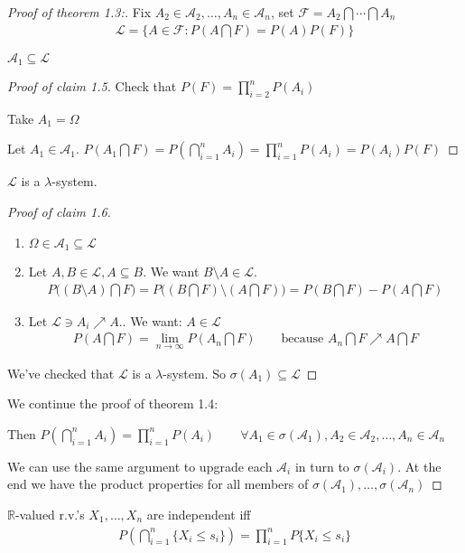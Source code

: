 \documentclass[11pt]{article}
\begin{document}
\vspace*{7mm}
\begin{proof}[Proof of theorem 1.3:]
    Fix $A_2 \in \mathcal{A}_{2}, \ldots ,A_n \in \mathcal{A}_{n}$, set 
    $\mathcal{F} = A_2 \bigcap \cdots \bigcap A_n$
    \begin{align*}
        \mathcal{L} = \{ A \in \mathcal{F}: P(A \bigcap F) = P(A)P(F) \}
    \end{align*}
    \begin{claim}
        $\mathcal{A}_1 \subseteq \mathcal{L}$
        \begin{proof}[Proof of claim 1.5]
            Check that $P(F) = \prod_{i=2}^{n}P(A_{i}) $

            Take $A_1 = \Omega$

            Let $A_1 \in \mathcal{A}_{1}$. $P(A_{1} \bigcap F) = P(\bigcap_{i=1}^{n}A_{i})
            = \prod_{i=1}^{n}P(A_{i}) = P(A_{i})P(F) $
        \end{proof}
    \end{claim}
    \begin{claim}
        $\mathcal{L}$ is a $\lambda$-system.
        \begin{proof}[Proof of claim 1.6]
            \begin{enumerate}
                \item $\Omega \in \mathcal{A}_{1} \subseteq \mathcal{L}$
                \item Let $A,B \in \mathcal{L}, A \subseteq B$. We want $B\setminus A \in \mathcal{L}$.
                \begin{align*}
                    P\Big((B\setminus A) \bigcap F\Big) = P\Big((B \bigcap F)\setminus(A \bigcap F)\Big)
                    = P(B \bigcap F) - P(A \bigcap F)
                \end{align*}
                \item Let $\mathcal{L} \ni A_{i} \nearrow A.$. We want: $A \in \mathcal{L}$
                \begin{align*}
                    P(A\bigcap F) = \lim_{n \to \infty}P(A_n \bigcap F) \qquad \text{because }
                    A_n \bigcap F \nearrow A\bigcap F
                \end{align*}
            \end{enumerate}
            We've checked that $\mathcal{L}$ is a $\lambda$-system. So $\sigma(A_1) \subseteq \mathcal{L}$

        \end{proof}
    \end{claim}
    We continue the proof of theorem 1.4:

    Then $P(\bigcap _{i=1}^{n} A_i) = \prod_{i=1}^{n} P(A_{i}) \qquad \forall 
     A_1 \in \sigma(\mathcal{A}_1), A_2 \in \mathcal{A}_{2}, \ldots ,A_n \in \mathcal{A}_{n}$

     We can use the same argument to upgrade each $\mathcal{A}_i$ in turn to $\sigma(\mathcal{A}_{i})$.
     At the end we have the product properties for all members of $\sigma(\mathcal{A}_{1}), \ldots ,
     \sigma(\mathcal{A}_{n})$
\end{proof}

\begin{corollary}
    $\mathbb{R}$-valued r.v.'s $X_1, \ldots ,X_n$ are independent iff 
    \begin{align*}
        P(\bigcap _{i=1}^{n}\{ X_{i} \le s_i \}) = \prod_{i=1}^{n}P\{ X_{i} \le s_i \} 
    \end{align*}
\end{corollary}
\end{document}
